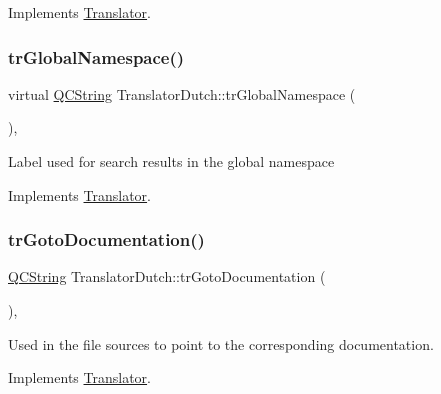 Implements \mbox{\hyperlink{class_translator}{Translator}}.

\mbox{\label{class_translator_dutch_a65e402eac00bb3e5f34557bcd7da61d3}} 
\subsubsection{\texorpdfstring{trGlobalNamespace()}{trGlobalNamespace()}}
{\footnotesize\ttfamily virtual \mbox{\hyperlink{class_q_c_string}{Q\+C\+String}} Translator\+Dutch\+::tr\+Global\+Namespace (\begin{DoxyParamCaption}{ }\end{DoxyParamCaption})\hspace{0.3cm}{\ttfamily [inline]}, {\ttfamily [virtual]}}

Label used for search results in the global namespace 

Implements \mbox{\hyperlink{class_translator}{Translator}}.

\mbox{\label{class_translator_dutch_abd91657edc96c609f36ff6d960312680}} 
\subsubsection{\texorpdfstring{trGotoDocumentation()}{trGotoDocumentation()}}
{\footnotesize\ttfamily \mbox{\hyperlink{class_q_c_string}{Q\+C\+String}} Translator\+Dutch\+::tr\+Goto\+Documentation (\begin{DoxyParamCaption}{ }\end{DoxyParamCaption})\hspace{0.3cm}{\ttfamily [inline]}, {\ttfamily [virtual]}}

Used in the file sources to point to the corresponding documentation. 

Implements \mbox{\hyperlink{class_translator}{Translator}}.

\mbox{\label{class_translator_dutch_a41d8d60d67fa80798f103a943e562a60}} 
